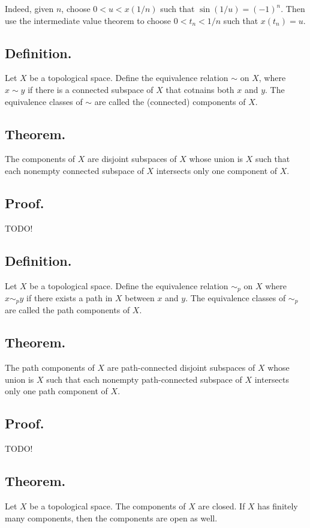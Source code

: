 \documentclass[titlepage]{article}
\begin{document}
Indeed, given $n$, choose $0 < u < x(1/n)$ such that $\sin(1/u) = (-1)^{n}$. Then use the intermediate value theorem to choose $0 < t_{n} < 1/n$ such that $x(t_{n}) = u$.

\subsection{Definition.} Let $X$ be a topological space. Define the equivalence relation $\sim$ on $X$, where $x \sim y$ if there is a connected subspace of $X$ that cotnains both $x$ and $y$. The equivalence classes of $\sim$ are called the (connected) components of $X$.

\subsection{Theorem.} The components of $X$ are disjoint subspaces of $X$ whose union is $X$ such that each nonempty connected subspace of $X$ intersects only one component of $X$.

\subsection{Proof.} TODO!

\subsection{Definition.} Let $X$ be a topological space. Define the equivalence relation $\sim_{p}$ on $X$ where $x \sim_{p} y$ if there exists a path in $X$ between $x$ and $y$. The equivalence classes of $\sim_{p}$ are called the path components of $X$.

\subsection{Theorem.} The path components of $X$ are path-connected disjoint subspaces of $X$ whose union is $X$ such that each nonempty path-connected subspace of $X$ intersects only one path component of $X$.

\subsection{Proof.} TODO!

\subsection{Theorem.} Let $X$ be a topological space. The components of $X$ are closed. If $X$ has finitely many components, then the components are open as well.
\end{document}
